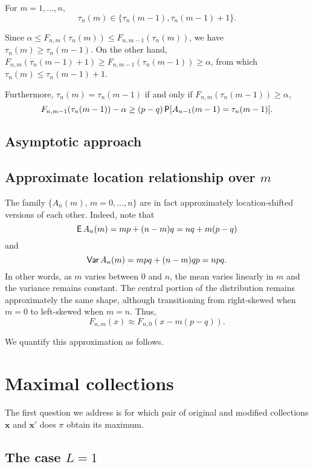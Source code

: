 \documentclass[11pt,draft]{article}
\newcommand{\xv}{\mathbf{x}}
\begin{document}
\begin{claim}
For $m = 1,\dots,n$,
\[ \tau_n(m) \in \{ \tau_n(m-1), \tau_n(m-1) + 1 \}. \]
\end{claim}
\begin{pf}
Since $\alpha \leq F_{n,m}(\tau_n(m)) \leq F_{n,m-1}(\tau_n(m))$, we have $\tau_n(m) \geq \tau_n(m-1)$.
On the other hand, $F_{n,m}(\tau_n(m-1)+1) \geq F_{n,m-1}(\tau_n(m-1)) \geq \alpha$, from which $\tau_n(m) \leq \tau_n(m-1) + 1$.
\end{pf}

Furthermore, $\tau_n(m) = \tau_n(m-1)$ if and only if
$F_{n,m}(\tau_n(m-1)) \geq \alpha$, \ie
\[ F_{n,m-1}(\tau_n(m-1)) - \alpha \geq (p-q)\P[A_{n-1}(m-1) = \tau_n(m-1)]. \]



\subsection{Asymptotic approach}

    



\subsection{Approximate location relationship over $m$}

The family $\{A_n(m),\, m = 0,\dots,n\}$ are in fact approximately location-shifted versions of each other.
Indeed, note that
\[ \EP A_n(m) = mp + (n-m)q = nq + m(p-q) \]
and
\[ \Var A_n(m) = mpq + (n-m)qp = npq. \]
In other words, as $m$ varies between $0$ and $n$, the mean varies linearly in $m$ and the variance remains constant.
The central portion of the distribution remains approximately the same shape, although transitioning from right-skewed when $m=0$ to left-skewed when $m=n$.
Thus, 
\[ F_{n,m}(x) \approx F_{n,0}(x - m(p-q)). \]

We quantify this approximation as follows.


\section{Maximal collections}


The first question we address is for which pair of original and modified collections $\xv$ and $\xv'$ does $\pi$ obtain its maximum.

\subsection{The case $L = 1$}
\end{document}
